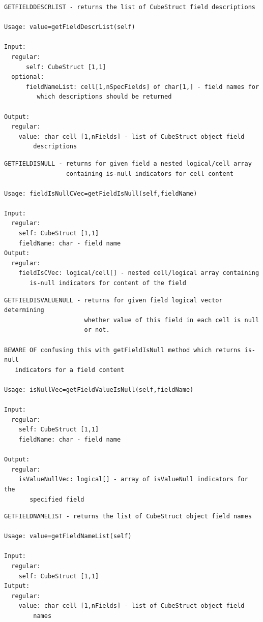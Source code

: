 \documentclass[letterpaper,10pt,english]{sphinxmanual}
\begin{document}
\label{chap_func:smartdb-relations-atypifiedstaticrelation-getfielddescrlist}
\begin{Verbatim}[commandchars=\\\{\}]
GETFIELDDESCRLIST - returns the list of CubeStruct field descriptions

Usage: value=getFieldDescrList(self)

Input:
  regular:
      self: CubeStruct [1,1]
  optional:
      fieldNameList: cell[1,nSpecFields] of char[1,] - field names for
         which descriptions should be returned

Output:
  regular:
    value: char cell [1,nFields] - list of CubeStruct object field
        descriptions
\end{Verbatim}
\label{chap_func:smartdb-relations-atypifiedstaticrelation-getfieldisnull}
\begin{Verbatim}[commandchars=\\\{\}]
GETFIELDISNULL - returns for given field a nested logical/cell array
                 containing is-null indicators for cell content

Usage: fieldIsNullCVec=getFieldIsNull(self,fieldName)

Input:
  regular:
    self: CubeStruct [1,1]
    fieldName: char - field name
Output:
  regular:
    fieldIsCVec: logical/cell[] - nested cell/logical array containing
       is-null indicators for content of the field
\end{Verbatim}
\label{chap_func:smartdb-relations-atypifiedstaticrelation-getfieldisvaluenull}
\begin{Verbatim}[commandchars=\\\{\}]
GETFIELDISVALUENULL - returns for given field logical vector determining
                      whether value of this field in each cell is null
                      or not.

BEWARE OF confusing this with getFieldIsNull method which returns is-null
   indicators for a field content

Usage: isNullVec=getFieldValueIsNull(self,fieldName)

Input:
  regular:
    self: CubeStruct [1,1]
    fieldName: char - field name

Output:
  regular:
    isValueNullVec: logical[] - array of isValueNull indicators for the
       specified field
\end{Verbatim}
\label{chap_func:smartdb-relations-atypifiedstaticrelation-getfieldnamelist}
\begin{Verbatim}[commandchars=\\\{\}]
GETFIELDNAMELIST - returns the list of CubeStruct object field names

Usage: value=getFieldNameList(self)

Input:
  regular:
    self: CubeStruct [1,1]
Iutput:
  regular:
    value: char cell [1,nFields] - list of CubeStruct object field
        names
\end{Verbatim}
\end{document}
